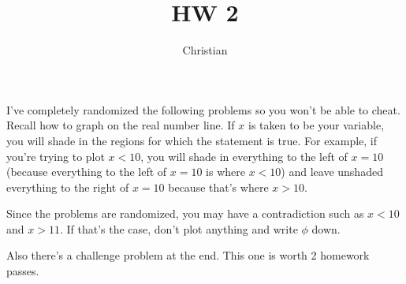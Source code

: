 \documentclass[12pt]{article}
\begin{document}
			\title{HW 2}
			\author{Christian}
			\date{}
			\maketitle
I've completely randomized the following problems so you won't be able to cheat. Recall how to 
graph on the real number line. If $x$ is taken
to be your variable, you will shade in the regions for which the statement is true. For example, if you're
trying to plot $x < 10$, you will shade in everything to the left of $x = 10$ (because everything to the 
left of $x = 10$ is where $x < 10$) and leave unshaded everything to the right of $x = 10$ because that's where
$x > 10$.

Since the problems are randomized, you may have a contradiction such as $x < 10$ and $x > 11$. If that's the case,
don't plot anything and write $\phi$ down.

Also there's a challenge problem at the end. This one is worth 2 homework passes.
\end{document}
